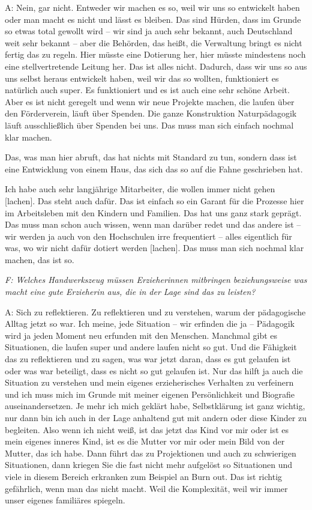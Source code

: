 \begin{linenumbers*}
A: Nein, gar nicht. Entweder wir machen es so, weil wir uns so entwickelt haben oder man macht es nicht und lässt es bleiben. Das sind Hürden, dass im Grunde so etwas total gewollt wird -- wir sind ja auch sehr bekannt, auch Deutschland weit sehr bekannt -- aber die Behörden, das heißt, die Verwaltung bringt es nicht fertig das zu regeln. Hier müsste eine Dotierung her, hier müsste mindestens noch eine stellvertretende Leitung her. Das ist alles nicht. Dadurch, dass wir uns so aus uns selbst heraus entwickelt haben, weil wir das so wollten, funktioniert es natürlich auch super. Es funktioniert und es ist auch eine sehr schöne Arbeit. Aber es ist nicht geregelt und wenn wir neue Projekte machen, die laufen über den Förderverein, läuft über Spenden. Die ganze Konstruktion Naturpädagogik läuft ausschließlich über Spenden bei uns.
Das muss man sich einfach nochmal klar machen. 

Das, was man hier abruft, das hat nichts mit Standard zu tun, sondern dass ist eine Entwicklung von einem Haus, das sich das so auf die Fahne geschrieben hat.
 
Ich habe auch sehr langjährige Mitarbeiter, die wollen immer nicht gehen [lachen]. Das steht auch dafür. Das ist einfach so ein Garant für die Prozesse hier im Arbeitsleben mit den Kindern und Familien. Das hat uns ganz stark geprägt. Das muss man schon auch wissen, wenn man darüber redet und das andere ist -- wir werden ja auch von den Hochschulen irre frequentiert -- alles eigentlich für was, wo wir nicht dafür dotiert werden [lachen]. Das muss man sich nochmal klar machen, das ist so.

\emph{F: Welches Handwerkszeug müssen Erzieherinnen mitbringen beziehungsweise was macht eine gute Erzieherin aus, die in der Lage sind das zu leisten?}

A: Sich zu reflektieren. Zu reflektieren und zu verstehen, warum der pädagogische Alltag jetzt so war. Ich meine, jede Situation -- wir erfinden die ja -- Pädagogik wird ja jeden Moment neu erfunden mit den Menschen. Manchmal gibt es Situationen, die laufen super und andere laufen nicht so gut. Und die Fähigkeit das zu reflektieren und zu sagen, was war jetzt daran, dass es gut gelaufen ist oder was war beteiligt, dass es nicht so gut gelaufen ist. Nur das hilft ja auch die Situation zu verstehen und mein eigenes erzieherisches Verhalten zu verfeinern und ich muss mich im Grunde mit meiner eigenen Persönlichkeit und Biografie auseinandersetzen. Je mehr ich mich geklärt habe, Selbstklärung ist ganz wichtig, nur dann bin ich auch in der Lage anhaltend gut mit andern oder diese Kinder zu begleiten. Also wenn ich nicht weiß, ist das jetzt das Kind vor mir oder ist es mein eigenes inneres Kind, ist es die Mutter vor mir oder mein Bild von der Mutter, das ich habe. Dann führt das zu Projektionen und auch zu schwierigen Situationen, dann kriegen Sie die fast nicht mehr aufgelöst so Situationen und viele in diesem Bereich erkranken zum Beispiel an Burn out. Das ist richtig gefährlich, wenn man das nicht macht. Weil die Komplexität, weil wir immer unser eigenes familiäres spiegeln. 


\end{linenumbers*}
